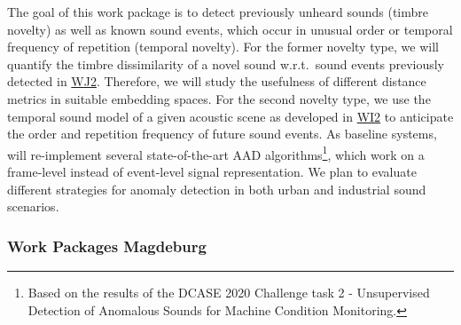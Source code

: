 \documentclass[11pt]{article}
\newcommand{\wpref}[2]{\hyperlink{sec:W#1}{#2}}
\begin{document}
The goal of this work package is to detect previously unheard sounds (timbre novelty) as well as known sound events, which occur in unusual order or temporal frequency of repetition (temporal novelty).
For the former novelty type, we will quantify the timbre dissimilarity of a novel sound w.r.t.~sound events previously detected in \wpref{J2}{WJ2}.
Therefore, we will study the usefulness of different distance metrics in suitable embedding spaces. 
For the second novelty type, we use the temporal sound model of a given acoustic scene as developed in \wpref{I2}{WI2} to anticipate the order and repetition frequency of future sound events. 
As baseline systems, will re-implement several state-of-the-art AAD algorithms\footnote{Based on the results of the DCASE 2020 Challenge task 2 - Unsupervised Detection of Anomalous Sounds for Machine Condition Monitoring.}, which work on a frame-level instead of event-level signal representation. We plan to evaluate different strategies for anomaly detection in both urban and industrial sound scenarios.


\subsubsection{Work Packages Magdeburg}
\label{sec:wm}
\end{document}

